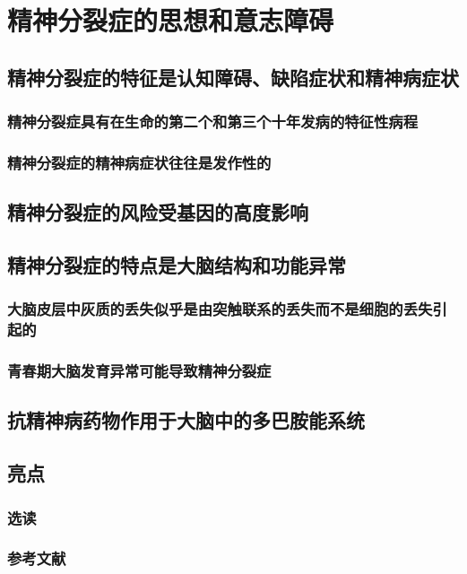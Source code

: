 \chapter{精神分裂症的思想和意志障碍}

\section{精神分裂症的特征是认知障碍、缺陷症状和精神病症状}
\subsection{精神分裂症具有在生命的第二个和第三个十年发病的特征性病程}
\subsection{精神分裂症的精神病症状往往是发作性的}

\section{精神分裂症的风险受基因的高度影响}

\section{精神分裂症的特点是大脑结构和功能异常}
\subsection{大脑皮层中灰质的丢失似乎是由突触联系的丢失而不是细胞的丢失引起的}
\subsection{青春期大脑发育异常可能导致精神分裂症}

\section{抗精神病药物作用于大脑中的多巴胺能系统}

\section{亮点}
\subsection{选读}
\subsection{参考文献}
